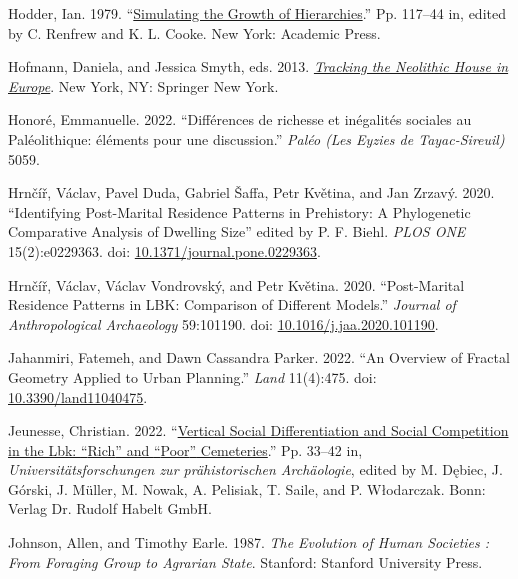 \documentclass[
  12pt,
]{book}
\newlength{\cslhangindent}
\newlength{\cslentryspacingunit} %
\newenvironment{CSLReferences}[2] %
 {%
  \setlength{\parindent}{0pt}
  \ifodd #1
  \let\oldpar\par
  \def\par{\hangindent=\cslhangindent\oldpar}
  \fi
  \setlength{\parskip}{#2\cslentryspacingunit}
 }%
 {}
\begin{document}
\begin{CSLReferences}{1}{0}
\leavevmode{}%
Hodder, Ian. 1979. {``\href{https://doi.org/10.1016/B978-0-12-586050-5.50015-4}{Simulating the Growth of Hierarchies}.''} Pp. 117--44 in, edited by C. Renfrew and K. L. Cooke. New York: Academic Press.

\leavevmode{}%
Hofmann, Daniela, and Jessica Smyth, eds. 2013. \emph{\href{https://doi.org/10.1007/978-1-4614-5289-8}{Tracking the Neolithic House in Europe}}. New York, NY: Springer New York.

\leavevmode{}%
Honoré, Emmanuelle. 2022. {``Différences de richesse et inégalités sociales au Paléolithique: éléments pour une discussion.''} \emph{Paléo (Les Eyzies de Tayac-Sireuil)} 5059.

\leavevmode{}%
Hrnčíř, Václav, Pavel Duda, Gabriel Šaffa, Petr Květina, and Jan Zrzavý. 2020. {``Identifying Post-Marital Residence Patterns in Prehistory: A Phylogenetic Comparative Analysis of Dwelling Size''} edited by P. F. Biehl. \emph{PLOS ONE} 15(2):e0229363. doi: \href{https://doi.org/10.1371/journal.pone.0229363}{10.1371/journal.pone.0229363}.

\leavevmode{}%
Hrnčíř, Václav, Václav Vondrovský, and Petr Květina. 2020. {``Post-Marital Residence Patterns in LBK: Comparison of Different Models.''} \emph{Journal of Anthropological Archaeology} 59:101190. doi: \href{https://doi.org/10.1016/j.jaa.2020.101190}{10.1016/j.jaa.2020.101190}.

\leavevmode{}%
Jahanmiri, Fatemeh, and Dawn Cassandra Parker. 2022. {``An Overview of Fractal Geometry Applied to Urban Planning.''} \emph{Land} 11(4):475. doi: \href{https://doi.org/10.3390/land11040475}{10.3390/land11040475}.

\leavevmode{}%
Jeunesse, Christian. 2022. {``\href{https://www.academia.edu/95075660/Vertical_social_differentiation_and_social_competition_in_the_Lbk_rich_and_poor_cemeteries}{Vertical Social Differentiation and Social Competition in the Lbk: {``}Rich{''} and {``}Poor{''} Cemeteries}.''} Pp. 33--42 in, \emph{Universitätsforschungen zur prähistorischen Archäologie}, edited by M. Dębiec, J. Górski, J. Müller, M. Nowak, A. Pelisiak, T. Saile, and P. Włodarczak. Bonn: Verlag Dr. Rudolf Habelt GmbH.

\leavevmode{}%
Johnson, Allen, and Timothy Earle. 1987. \emph{The Evolution of Human Societies : From Foraging Group to Agrarian State}. Stanford: Stanford University Press.


\end{CSLReferences}
\end{document}
